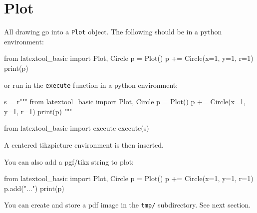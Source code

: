 \section{Plot}

All drawing go into a \verb!Plot! object.
The following should be in a python environment:
\begin{console}
from latextool_basic import Plot, Circle
p = Plot()
p += Circle(x=1, y=1, r=1)
print(p)
\end{console}
or run in the \verb!execute! function in a python environment:
\begin{console}
s = r"""
from latextool_basic import Plot, Circle
p = Plot()
p += Circle(x=1, y=1, r=1)
print(p)
"""

from latextool_basic import execute
execute(s)
\end{console}

A centered tikzpicture environment is then inserted.

You can also add a pgf/tikz string to plot:
\begin{console}
from latextool_basic import Plot, Circle
p = Plot()
p += Circle(x=1, y=1, r=1)
p.add("\draw ...")
print(p)
\end{console}

You can create and store a pdf image in the \verb!tmp/! subdirectory.
See next section.
